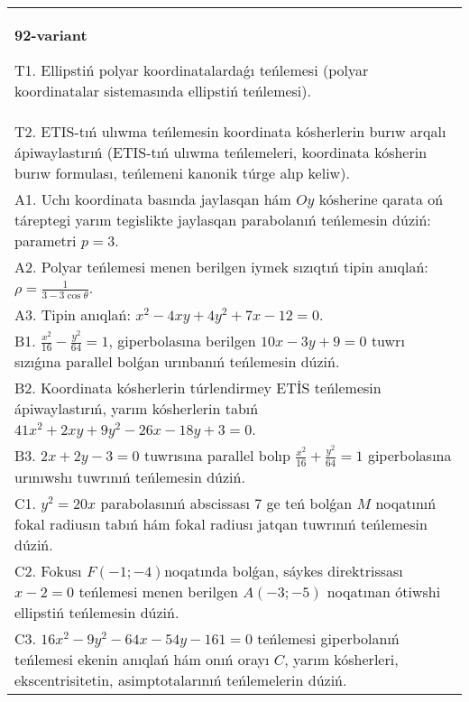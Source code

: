 \documentclass{article}
\begin{document}
\begin{tabular}{m{17cm}}
\textbf{92-variant}
\newline

T1. Ellipstiń polyar koordinatalardaǵı teńlemesi (polyar koordinatalar sistemasında ellipstiń teńlemesi).\\

T2. ETIS-tıń ulıwma teńlemesin koordinata kósherlerin burıw arqalı ápiwaylastırıń (ETIS-tıń ulıwma teńlemeleri, koordinata kósherin burıw formulası, teńlemeni kanonik túrge alıp keliw).\\

A1. Uchı koordinata basında jaylasqan hám $Oy$ kósherine qarata oń táreptegi yarım tegislikte jaylasqan parabolanıń teńlemesin dúziń: parametri $p=3$.\\

A2. Polyar teńlemesi menen berilgen iymek sızıqtıń tipin anıqlań: $\rho=\frac{1}{3-3\cos\theta}$.\\

A3. Tipin anıqlań: $x^{2}-4 xy+4 y^{2}+7 x-12=0$.\\

B1. $\frac{x^{2}}{16} - \frac{y^{2}}{64} = 1$, giperbolasına berilgen $10x - 3y + 9 = 0$ tuwrı sızıǵına parallel bolǵan urınbanıń teńlemesin dúziń.  \\

B2. Koordinata kósherlerin túrlendirmey ETİS teńlemesin ápiwaylastırıń, yarım kósherlerin tabıń $41x^{2} + 2xy + 9y^{2} - 26x - 18y + 3 = 0$.  \\

B3. $2x + 2y - 3 = 0$ tuwrısına parallel bolıp $\frac{x^{2}}{16} + \frac{y^{2}}{64} = 1$ giperbolasına urınıwshı tuwrınıń teńlemesin dúziń.  \\

C1. $y^{2} = 20x$ parabolasınıń abscissası 7 ge teń bolǵan $M$ noqatınıń fokal radiusın tabıń hám fokal radiusı jatqan tuwrınıń teńlemesin dúziń.  \\

C2. Fokusı $F( - 1; - 4)$noqatında bolǵan, sáykes direktrissası $x - 2 = 0$ teńlemesi menen berilgen $A( - 3; - 5)$ noqatınan ótiwshi ellipstiń teńlemesin dúziń.  \\

C3. $16x^{2} - 9y^{2} - 64x - 54y - 161 = 0$ teńlemesi giperbolanıń teńlemesi ekenin anıqlań hám onıń orayı $C$, yarım kósherleri, ekscentrisitetin, asimptotalarınıń teńlemelerin dúziń.  \\

\end{tabular}
\vspace{1cm}
\end{document}
